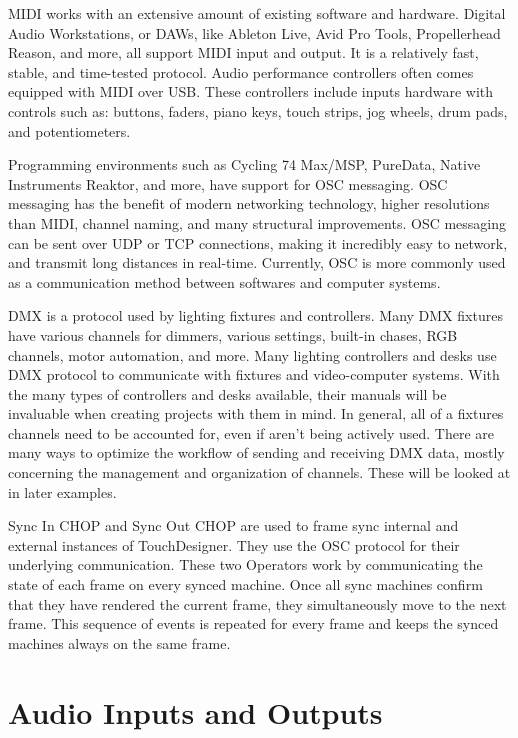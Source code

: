 \begin{fullwidth}
MIDI works with an extensive amount of existing software and hardware. Digital Audio Workstations, or DAWs, like Ableton Live, Avid Pro Tools, Propellerhead Reason, and more, all support MIDI input and output. It is a relatively fast, stable, and time-tested protocol. Audio performance controllers often comes equipped with MIDI over USB. These controllers include inputs hardware with controls such as: buttons, faders, piano keys, touch strips, jog wheels, drum pads, and potentiometers.

Programming environments such as Cycling 74 Max/MSP, PureData, Native Instruments Reaktor, and more, have support for OSC messaging. OSC messaging has the benefit of modern networking technology, higher resolutions than MIDI, channel naming, and many structural improvements. OSC messaging can be sent over UDP or TCP connections, making it incredibly easy to network, and transmit long distances in real-time. Currently, OSC is more commonly used as a communication method between softwares and computer systems.

DMX is a protocol used by lighting fixtures and controllers. Many DMX fixtures have various channels for dimmers, various settings, built-in chases, RGB channels, motor automation, and more. Many lighting controllers and desks use DMX protocol to communicate with fixtures and video-computer systems. With the many types of controllers and desks available, their manuals will be invaluable when creating projects with them in mind. In general, all of a fixtures channels need to be accounted for, even if aren't being actively used. There are many ways to optimize the workflow of sending and receiving DMX data, mostly concerning the management and organization of channels. These will be looked at in later examples.

Sync In CHOP and Sync Out CHOP are used to frame sync internal and external instances of TouchDesigner. They use the OSC protocol for their underlying communication. These two Operators work by communicating the state of each frame on every synced machine. Once all sync machines confirm that they have rendered the current frame, they simultaneously move to the next frame. This sequence of events is repeated for every frame and keeps the synced machines always on the same frame. 
\end{fullwidth}


\section{Audio Inputs and Outputs}

